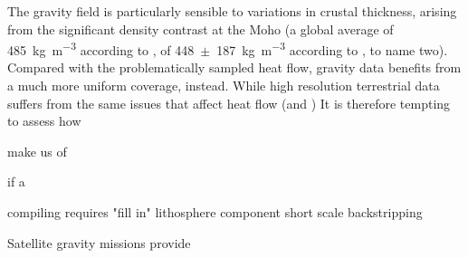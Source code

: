 The gravity field is particularly sensible to variations in crustal thickness, arising from the significant density contrast at the Moho (a global average of \SI{485}{\kilo \gram \per \cubic \metre} according to \cite{Tenzer2012}, of \num{448}~$\pm$~\SI{187}{\kilo \gram \per \cubic \metre} according to \cite{Sjoberg2011}, to name two).
Compared with the problematically sampled heat flow, gravity data benefits from a much more uniform coverage, instead.
While high resolution terrestrial data suffers from the same issues that affect heat flow (and )
It is therefore tempting to assess how 

make us of

if a %

compiling requires "fill in"
lithosphere component
short scale
backstripping


Satellite gravity missions provide %



